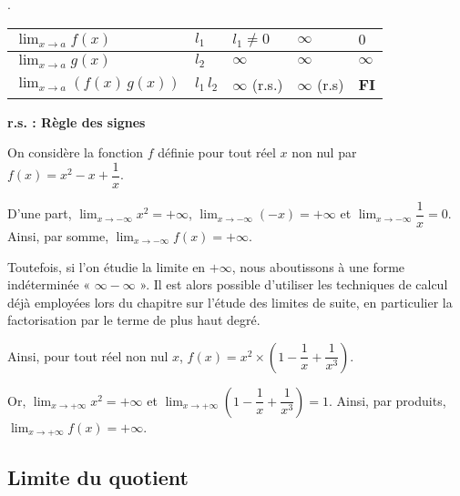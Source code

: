 \documentclass[11pt,fleqn, openany]{book} %
\begin{document}
\begin{proposition}.
\begin{center}

\begin{tabularx}{\linewidth}{|l|X|X|X|X|}
\hline
$\displaystyle \lim_{x \to a} f(x)$ & $l_1 $ & $l_1 \neq 0$ & $\infty$ & $0$ \\
\hline
$\displaystyle \lim_{x \to a} g(x)$ & $l_2$ & $\infty$ &  $\infty$ & $\infty$ \\
\hline
$\displaystyle \lim_{x \to a} (f(x)\,g(x))$ & $l_1\,l_2$ & $\infty$ (r.s.) & $\infty$ (r.s)& \textbf{FI} \\
\hline
\end{tabularx}

 \textbf{r.s. : Règle des signes}
 \end{center} \vspace{-1cm}
\end{proposition}

\begin{example}On considère la fonction $f$ définie pour tout réel $x$ non nul par $f(x)=x^2-x+\dfrac{1}{x}$.

D'une part, $\displaystyle\lim_{x \to -\infty} x^2 = +\infty$, $\displaystyle\lim_{x \to -\infty} (-x) = +\infty$ et $\displaystyle\lim_{x \to -\infty} \dfrac{1}{x} = 0$. Ainsi, par somme, $\displaystyle\lim_{x \to -\infty} f(x) = +\infty$.

Toutefois, si l'on étudie la limite en $+\infty$, nous aboutissons à une forme indéterminée « $\infty - \infty$ ». Il est alors possible d'utiliser les techniques de calcul déjà employées lors du chapitre sur l'étude des limites de suite, en particulier la factorisation par le terme de plus haut degré. 

Ainsi, pour tout réel non nul $x$, $f(x)=x^2 \times \left(1-\dfrac{1}{x}+\dfrac{1}{x^3}\right)$.

Or, $\displaystyle\lim_{x \to +\infty}x^2=+\infty$ et $\displaystyle\lim_{x \to +\infty}\left(1-\dfrac{1}{x}+\dfrac{1}{x^3}\right)=1$. Ainsi, par produits, $\displaystyle\lim_{x \to +\infty}f(x)=+\infty$.\end{example}

\subsection{Limite du quotient}
\end{document}
